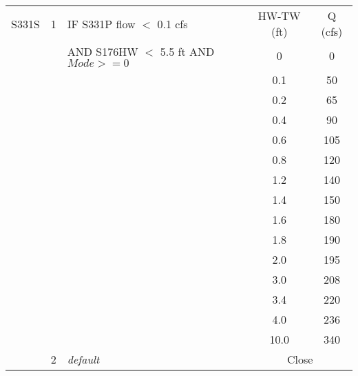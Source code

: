 \begin{table}[!h]
\begin{tabular}{|l|c|l|c|c|}
S331S         &  1  & IF  S331P flow $<$ 0.1 cfs                   & HW-TW (ft) & Q (cfs)  \\
              &     & AND S176HW $<$ 5.5 ft AND $Mode >= 0$        & 0	&	0   \\
              &     &                                              & 0.1	&	50  \\
              &     &                                              & 0.2	&	65  \\
              &     &                                              & 0.4	&	90  \\
              &     &                                              & 0.6    &	105 \\
              &     &                                              & 0.8	&	120 \\
              &     &                                              & 1.2	&	140 \\
              &     &                                              & 1.4 &   150 \\
              &     &                                              & 1.6 &   180 \\
              &     &                                              & 1.8 &   190 \\
              &     &                                              & 2.0 &   195 \\
              &     &                                              & 3.0 &   208 \\
              &     &                                              & 3.4 &   220 \\
              &     &                                              & 4.0 &   236 \\
              &     &                                              & 10.0 &	340      \\
\hline
              &  2  & \it{default}                  & \multicolumn{2}{|c|}{Close}           \\
\hline
\hline
\end{tabular}
\end{table}
\normalsize

\clearpage


